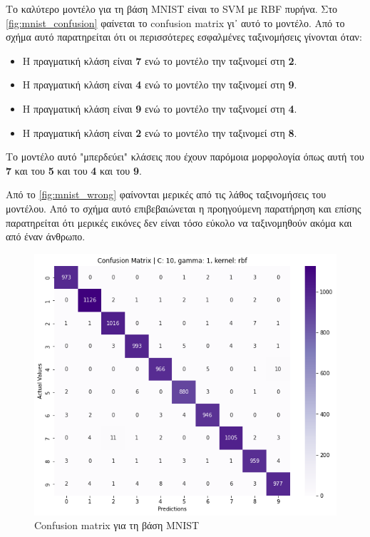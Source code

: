 \documentclass[a4paper]{article}
\begin{document}
Το καλύτερο μοντέλο για τη βάση MNIST είναι το SVM με RBF πυρήνα. Στο
\autoref{fig:mnist_confusion} φαίνεται το confusion matrix γι᾽ αυτό το μοντέλο.
Από το σχήμα αυτό παρατηρείται ότι οι περισσότερες εσφαλμένες ταξινομήσεις
γίνονται όταν:

\begin{itemize}
    \item Η πραγματική κλάση είναι {\bf7} ενώ το μοντέλο την ταξινομεί στη
        {\bf2}.
    \item Η πραγματική κλάση είναι {\bf4} ενώ το μοντέλο την ταξινομεί στη
        {\bf9}.
    \item Η πραγματική κλάση είναι {\bf9} ενώ το μοντέλο την ταξινομεί στη
        {\bf4}.
    \item Η πραγματική κλάση είναι {\bf2} ενώ το μοντέλο την ταξινομεί στη
        {\bf8}.
\end{itemize}

Το μοντέλο αυτό "μπερδεύει" κλάσεις που έχουν παρόμοια μορφολογία όπως αυτή του
{\bf7} και του {\bf5} και του {\bf4} και του {\bf9}.

Από το \autoref{fig:mnist_wrong} φαίνονται μερικές από τις λάθος ταξινομήσεις
του μοντέλου. Από το σχήμα αυτό επιβεβαιώνεται η προηγούμενη παρατήρηση και
επίσης παρατηρείται ότι μερικές εικόνες δεν είναι τόσο εύκολο να ταξινομηθούν
ακόμα και από έναν άνθρωπο.

\begin{figure}[H]
    \centering
    \includegraphics[width=0.6\linewidth]{figures/mnist/confusion_matrix.png}
    \caption{Confusion matrix για τη βάση MNIST}
    \label{fig:mnist_confusion}
\end{figure}
\end{document}
